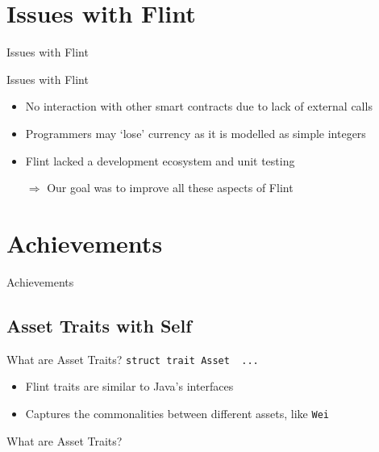 \documentclass[aspectratio=169]{beamer}
\newcommand{\sectionslide}[1]{%
  \section{#1}
  \begin{frame}
  \begin{center}
    \vbox{}
    {\LARGE \usebeamercolor[fg]{title} #1}
    \par
  \end{center}
  \end{frame}
}
\begin{document}
\sectionslide{Issues with Flint}
\begin{frame}{Issues with Flint}
    \begin{itemize}
        \item No interaction with other smart contracts due to lack of external calls
        \item Programmers may `lose' currency as it is modelled as simple integers
        \item Flint lacked a development ecosystem and unit testing
        \item[$\Rightarrow$] Our goal was to improve all these aspects of Flint
    \end{itemize}
\end{frame}

\sectionslide{Achievements}

\subsection{Asset Traits with Self}

\begin{frame}{What are Asset Traits?}
\centering\texttt{struct trait Asset { ... }}
\\

\begin{itemize}
    \item Flint traits are similar to Java's interfaces
    \item Captures the commonalities between different assets, like {\tt Wei}
\end{itemize}
\end{frame}

\begin{frame}{What are Asset Traits?}
\centering
\inputminted{swift}{code/asset-transfer-function.flint}
\end{frame}
\end{document}

